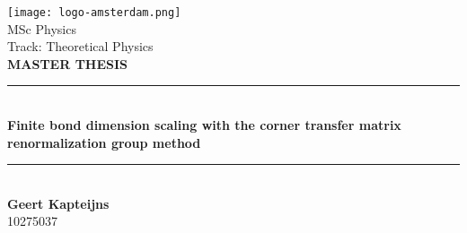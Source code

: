 \begin{titlingpage}
\newcommand{\HRule}{\rule{\linewidth}{0.5mm}} %
\center %

\texttt{[image: logo-amsterdam.png]}\\[0.4cm]

\Large MSc Physics \\[0.2cm]
\normalsize Track: Theoretical Physics \\[0.8cm] %
\textbf{\Large{M}\large{ASTER \Large{T}\large{HESIS}}}\\[0.4cm]

\HRule \\[0.5cm]
{\huge {\bfseries {Finite bond dimension scaling with the corner transfer matrix renormalization group
method}}}\\[0.4cm]
\HRule \\[0.4cm]


{\Large \textbf{Geert Kapteijns}}\\[0.2cm] %
10275037\\[1cm]

\vfill



\end{titlingpage}
